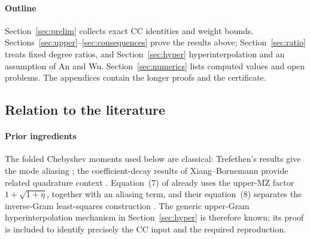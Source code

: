 \documentclass{siamart251216}
\begin{document}
\paragraph{Outline}
Section~\ref{sec:prelim} collects exact CC identities and weight bounds.
Sections~\ref{sec:upper}--\ref{sec:consequences} prove the results above;
Section~\ref{sec:ratio} treats fixed degree ratios, and
Section~\ref{sec:hyper} hyperinterpolation and an assumption of An and Wu.
Section~\ref{sec:numerics} lists computed values and open problems. The
appendices contain the longer proofs and the certificate.

\subsection{Relation to the literature}

\paragraph{Prior ingredients}
The folded Chebyshev moments used below are classical:
Trefethen's results give the mode aliasing
\cite[Thm.~5.2 and (5.2)--(5.4)]{LIT-055}; the coefficient-decay results of
Xiang--Bornemann provide related quadrature context \cite{LIT-056}.
Equation~(7) of \cite{LIT-045} already uses the upper-MZ factor
$1+\sqrt{1+\eta}$, together with an aliasing term, and their
equation~(8) separates the inverse-Gram least-squares construction
\cite{LIT-045}. The generic upper-Gram hyperinterpolation mechanism
in Section~\ref{sec:hyper} is therefore known; its proof is
included to identify precisely the CC input and the required reproduction.
\end{document}
